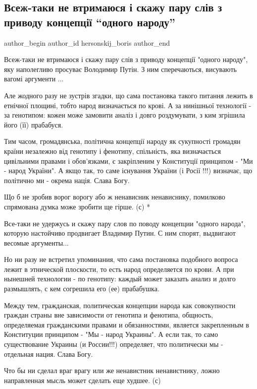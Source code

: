  
 
 
 
 
 
\subsection{Всеж-таки не втримаюся і скажу пару слів з приводу концепції \enquote{одного народу}}
\label{sec:08_07_2021.fb.hersonskij_boris.1.odin_narod_putin}
 
\ifcmt
 author_begin
   author_id hersonskij_boris
 author_end
\fi

Всеж-таки не втримаюся і скажу пару слів з приводу концепції "одного народу",
яку наполегливо просуває Володимир Путін. З ним сперечаються, висувають вагомі
аргументи ...

Але жодного разу не зустрів згадки, що сама постановка такого питання лежить в
етнічної площині, тобто народ визначається по крові. А за нинішньої технології
- за генотипом: кожен може замовити аналіз і довго роздумувати, з ким згрішила
його (її) прабабуся.

Тим часом, громадянська, політична концепції народу як сукупності громадян
країни незалежно від генотипу і фенотипу, спільність, яка визначається
цивільними правами і обов'язками, є закріпленим у Конституції принципом - "Ми -
народ України". А якщо так, то саме існування України (і Росії !!!) визначає,
що політично ми - окрема нація. Слава Богу.

Що б не зробив ворог ворогу або ж ненависник ненависнику, помилково спрямована
думка може зробити ще гірше. (с)
*

Все-таки не удержусь и скажу пару слов по поводу концепции "одного народа",
которую настойчиво продвигает Владимир Путин. С ним спорят, выдвигают весомые
аргументы...

Но ни разу не встретил упоминания, что сама постановка подобного вопроса лежит
в этнической плоскости, то есть народ определяется по крови. А при нынешней
технологии - по генотипу: каждый может заказать анализ и долго размышлять, с
кем согрешила его (ее) прабабушка.

Между тем, гражданская, политическая концепции народа как совокупности граждан
страны вне зависимости от генотипа и фенотипа, общность, определяемая
гражданскими правами и обязанностями, является закрепленным в Конституции
принципом - "Мы - народ Украины".  А если так, то само существование Украины (и
России!!!) определяет, что политически мы - отдельная нация. Слава Богу.

Что бы ни сделал враг врагу или же ненавистник ненавистнику, ложно направленная
мысль может сделать еще худшее. (с)

